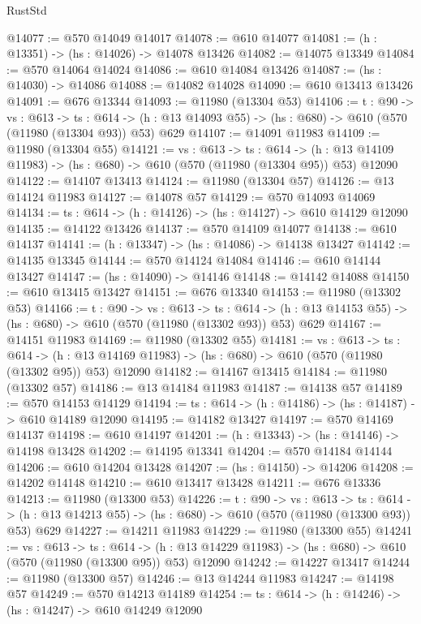 \begin{lexlean}{RustStd}
\begin{coremodule}
@14077 := @570 @14049 @14017
@14078 := @610 @14077
@14081 := (h : @13351) -> (hs : @14026) -> @14078 @13426
@14082 := @14075 @13349
@14084 := @570 @14064 @14024
@14086 := @610 @14084 @13426
@14087 := (hs : @14030) -> @14086
@14088 := @14082 @14028
@14090 := @610 @13413 @13426
@14091 := @676 @13344
@14093 := @11980 (@13304 @53)
@14106 := {t : @90} ->
  {vs : @613} ->
  {ts : @614} -> (h : @13 @14093 @55) -> (hs : @680) -> @610 (@570 (@11980 (@13304 @93)) @53) @629
@14107 := @14091 @11983
@14109 := @11980 (@13304 @55)
@14121 := {vs : @613} ->
  {ts : @614} ->
  (h : @13 @14109 @11983) -> (hs : @680) -> @610 (@570 (@11980 (@13304 @95)) @53) @12090
@14122 := @14107 @13413
@14124 := @11980 (@13304 @57)
@14126 := @13 @14124 @11983
@14127 := @14078 @57
@14129 := @570 @14093 @14069
@14134 := {ts : @614} -> (h : @14126) -> (hs : @14127) -> @610 @14129 @12090
@14135 := @14122 @13426
@14137 := @570 @14109 @14077
@14138 := @610 @14137
@14141 := (h : @13347) -> (hs : @14086) -> @14138 @13427
@14142 := @14135 @13345
@14144 := @570 @14124 @14084
@14146 := @610 @14144 @13427
@14147 := (hs : @14090) -> @14146
@14148 := @14142 @14088
@14150 := @610 @13415 @13427
@14151 := @676 @13340
@14153 := @11980 (@13302 @53)
@14166 := {t : @90} ->
  {vs : @613} ->
  {ts : @614} -> (h : @13 @14153 @55) -> (hs : @680) -> @610 (@570 (@11980 (@13302 @93)) @53) @629
@14167 := @14151 @11983
@14169 := @11980 (@13302 @55)
@14181 := {vs : @613} ->
  {ts : @614} ->
  (h : @13 @14169 @11983) -> (hs : @680) -> @610 (@570 (@11980 (@13302 @95)) @53) @12090
@14182 := @14167 @13415
@14184 := @11980 (@13302 @57)
@14186 := @13 @14184 @11983
@14187 := @14138 @57
@14189 := @570 @14153 @14129
@14194 := {ts : @614} -> (h : @14186) -> (hs : @14187) -> @610 @14189 @12090
@14195 := @14182 @13427
@14197 := @570 @14169 @14137
@14198 := @610 @14197
@14201 := (h : @13343) -> (hs : @14146) -> @14198 @13428
@14202 := @14195 @13341
@14204 := @570 @14184 @14144
@14206 := @610 @14204 @13428
@14207 := (hs : @14150) -> @14206
@14208 := @14202 @14148
@14210 := @610 @13417 @13428
@14211 := @676 @13336
@14213 := @11980 (@13300 @53)
@14226 := {t : @90} ->
  {vs : @613} ->
  {ts : @614} -> (h : @13 @14213 @55) -> (hs : @680) -> @610 (@570 (@11980 (@13300 @93)) @53) @629
@14227 := @14211 @11983
@14229 := @11980 (@13300 @55)
@14241 := {vs : @613} ->
  {ts : @614} ->
  (h : @13 @14229 @11983) -> (hs : @680) -> @610 (@570 (@11980 (@13300 @95)) @53) @12090
@14242 := @14227 @13417
@14244 := @11980 (@13300 @57)
@14246 := @13 @14244 @11983
@14247 := @14198 @57
@14249 := @570 @14213 @14189
@14254 := {ts : @614} -> (h : @14246) -> (hs : @14247) -> @610 @14249 @12090

\end{coremodule}
\end{lexlean}
